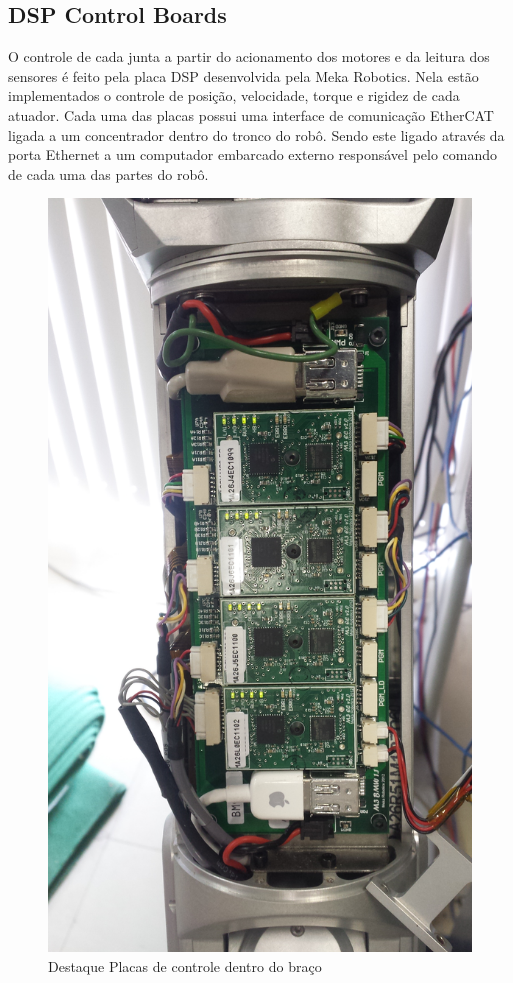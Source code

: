 \subsection{DSP Control Boards}
O controle de cada junta a partir do acionamento dos motores e da leitura dos sensores é feito pela placa DSP desenvolvida pela Meka Robotics. Nela estão implementados o controle de posição, velocidade, torque e rigidez de cada atuador. Cada uma das placas possui uma interface de comunicação EtherCAT ligada a um concentrador dentro do tronco do robô. Sendo este ligado através da porta Ethernet a um computador embarcado externo responsável pelo comando de cada uma das partes do robô.

\begin{figure}[H]
    \centering
    \includegraphics[width = 0.8\linewidth]{figs/dsp-control-wrist}
    \caption{Destaque Placas de controle dentro do braço}
    \label{fig:dsp-control-wrist}
\end{figure}

